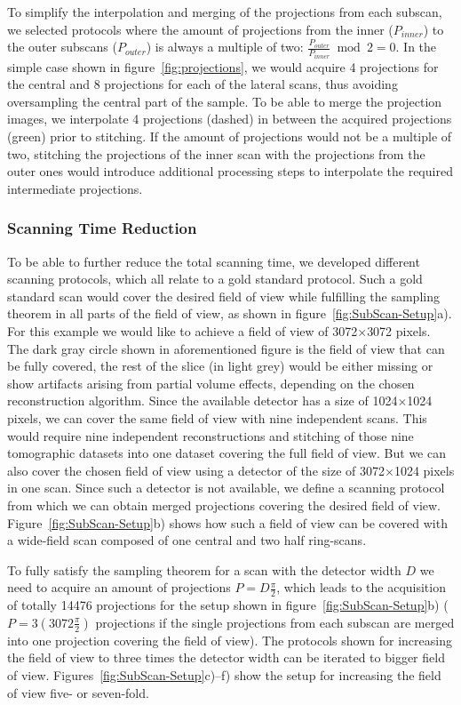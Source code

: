 To simplify the interpolation and merging of the projections from each subscan, we selected protocols where the amount of projections from the inner ($P_{inner}$) to the outer subscans ($P_{outer}$) is always a multiple of two: $\frac{P_{outer}}{P_{inner}} \bmod 2 = 0$. In the simple case shown in figure~\ref{fig:projections}, we would acquire 4 projections for the central and 8 projections for each of the lateral scans, thus avoiding oversampling the central part of the sample. To be able to merge the projection images, we interpolate 4 projections (dashed) in between the acquired projections (green) prior to stitching. If the amount of projections would not be a multiple of two, stitching the projections of the inner scan with the projections from the outer ones would introduce additional processing steps to interpolate the required intermediate projections.

\subsubsection{Scanning Time Reduction}%
To be able to further reduce the total scanning time, we developed different scanning protocols, which all relate to a gold standard protocol. Such a gold standard scan would cover the desired field of view while fulfilling the sampling theorem in all parts of the field of view, as shown in figure~\ref{fig:SubScan-Setup}a). For this example we would like to achieve a field of view of 3072$\times$3072 pixels. The dark gray circle shown in aforementioned figure is the field of view that can be fully covered, the rest of the slice (in light grey) would be either missing or show artifacts arising from partial volume effects, depending on the chosen reconstruction algorithm. Since the available detector has a size of 1024$\times$1024 pixels, we can cover the same field of view with nine independent scans. This would require nine independent reconstructions and stitching of those nine tomographic datasets into one dataset covering the full field of view. But we can also cover the chosen field of view using a detector of the size of 3072$\times$1024 pixels in one scan. Since such a detector is not available, we define a scanning protocol from which we can obtain merged projections covering the desired field of view. Figure~\ref{fig:SubScan-Setup}b) shows how such a field of view can be covered with a wide-field scan composed of one central and two half ring-scans.

To fully satisfy the sampling theorem for a scan with the detector width $D$ we need to acquire an amount of projections $P=D\frac{\pi}{2}$, which leads to the acquisition of totally 14476 projections for the setup shown in figure~\ref{fig:SubScan-Setup}b) ($P=3(3072\frac{\pi}{2})$ projections if the single projections from each subscan are merged into one projection covering the field of view). The protocols shown for increasing the field of view to three times the detector width can be iterated to bigger field of view. Figures~\ref{fig:SubScan-Setup}c)--f) show the setup for increasing the field of view five- or seven-fold.

